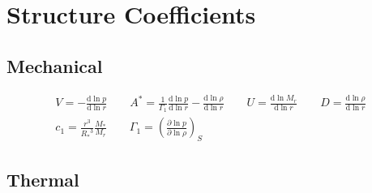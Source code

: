 \documentclass[fleqn]{article}
\newcommand{\diff}{\ensuremath{\mathrm{d}}}
\newcommand{\As}{\ensuremath{A^{\ast}}}
\newcommand{\Rstar}{\ensuremath{R_{\ast}}}
\newcommand{\Mstar}{\ensuremath{M_{\ast}}}
\begin{document}



\newpage

\section*{Structure Coefficients}

\subsection*{Mechanical}

\begin{gather*}
V = -\frac{\diff \ln p}{\diff \ln r} \qquad
\As = \frac{1}{\Gamma_{1}} \frac{\diff \ln p}{\diff \ln r} - \frac{\diff \ln \rho}{\diff \ln r} \qquad
U = \frac{\diff \ln M_{r}}{\diff \ln r} \qquad
D = \frac{\diff \ln \rho}{\diff \ln r} \\
c_1 = \frac{r^{3}}{\Rstar^{3}} \frac{\Mstar}{M_{r}} \qquad
\Gamma_{1} = \left( \frac{\partial \ln p}{\partial \ln \rho} \right)_{S}
\end{gather*}

\subsection*{Thermal}
\end{document}

